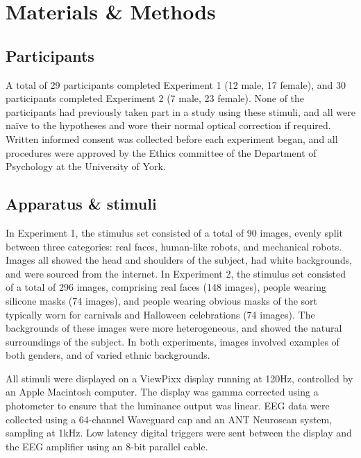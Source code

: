 \documentclass[
]{article}
\begin{document}
\hypertarget{materials-methods}{%
\section{Materials \& Methods}\label{materials-methods}}

\hypertarget{participants}{%
\subsection{Participants}\label{participants}}

A total of 29 participants completed Experiment 1 (12 male, 17 female), and 30 participants completed Experiment 2 (7 male, 23 female). None of the participants had previously taken part in a study using these stimuli, and all were naïve to the hypotheses and wore their normal optical correction if required. Written informed consent was collected before each experiment began, and all procedures were approved by the Ethics committee of the Department of Psychology at the University of York.

\hypertarget{apparatus-stimuli}{%
\subsection{Apparatus \& stimuli}\label{apparatus-stimuli}}

In Experiment 1, the stimulus set consisted of a total of 90 images, evenly split between three categories: real faces, human-like robots, and mechanical robots. Images all showed the head and shoulders of the subject, had white backgrounds, and were sourced from the internet. In Experiment 2, the stimulus set consisted of a total of 296 images, comprising real faces (148 images), people wearing silicone masks (74 images), and people wearing obvious masks of the sort typically worn for carnivals and Halloween celebrations (74 images). The backgrounds of these images were more heterogeneous, and showed the natural surroundings of the subject. In both experiments, images involved examples of both genders, and of varied ethnic backgrounds.

All stimuli were displayed on a ViewPixx display running at 120Hz, controlled by an Apple Macintosh computer. The display was gamma corrected using a photometer to ensure that the luminance output was linear. EEG data were collected using a 64-channel Waveguard cap and an ANT Neuroscan system, sampling at 1kHz. Low latency digital triggers were sent between the display and the EEG amplifier using an 8-bit parallel cable.
\end{document}

